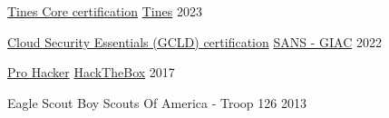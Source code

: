 
\begin{cvhonors}

  \cvhonor
    {\href{https://certification.tines.com/certificate/3FebGM9pnA}{Tines Core certification}} %
    {\href{https://www.tines.com/}{Tines}} %
    {} %
    {2023} %

  \cvhonor
    {\href{https://www.credly.com/badges/844480fc-0193-421c-8813-731f345666d6/}{Cloud Security Essentials (GCLD) certification}} %
    {\href{https://www.giac.org/}{SANS - GIAC}} %
    {} %
    {2022} %

  \cvhonor
    {\href{https://app.hackthebox.com/profile/3716}{Pro Hacker}} %
    {\href{https://www.hackthebox.com/}{HackTheBox}} %
    {} %
    {2017} %

  \cvhonor
    {Eagle Scout} %
    {Boy Scouts Of America - Troop 126} %
    {} %
    {2013} %

\end{cvhonors}